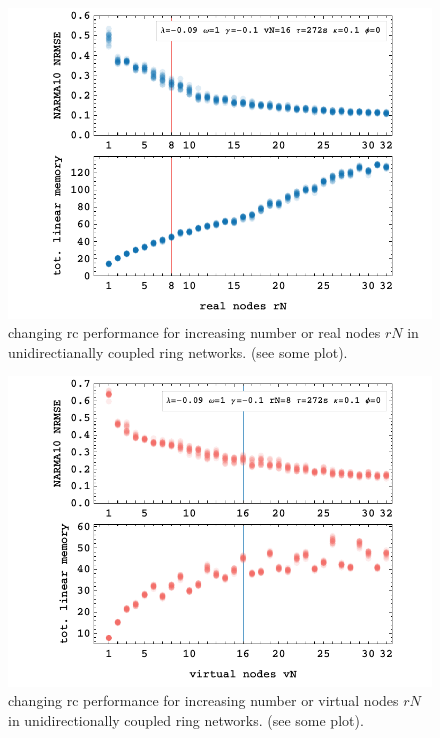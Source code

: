 	
	\begin{figure}
		\centering
		\includegraphics[width=0.9\linewidth]{pics/rNplot}
		\caption{changing rc performance for increasing number or real nodes $rN$ in unidirectianally coupled ring networks. (see some plot).}
		\label{fig:rN_1-32}
	\end{figure}

	\begin{figure}
		\centering
		\includegraphics[width=15cm]{pics/vNplot}
		\caption{changing rc performance for increasing number or virtual nodes $rN$ in unidirectionally coupled ring networks. (see some plot).}
		\label{fig:vN_1-32}
	\end{figure}


